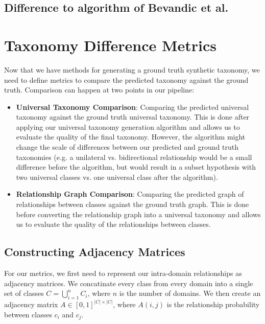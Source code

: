 \subsection{Difference to algorithm of Bevandic et al.}


\section{Taxonomy Difference Metrics}

Now that we have methods for generating a ground truth synthetic taxonomy,
we need to define metrics to compare the predicted taxonomy against the ground truth.
Comparison can happen at two points in our pipeline:
\begin{itemize}
    \item \textbf{Universal Taxonomy Comparison}: Comparing the predicted universal taxonomy against the ground truth universal taxonomy.
          This is done after applying our universal taxonomy generation algorithm
          and allows us to evaluate the quality of the final taxonomy.
          However, the algorithm might change the scale of differences between our predicted and ground truth taxonomies
          (e.g. a unilateral vs. bidirectional relationship would be a small difference before the algorithm,
          but would result in a subset hypothesis with two universal classes vs. one universal class after the algorithm).
    \item \textbf{Relationship Graph Comparison}: Comparing the predicted graph of relationships between classes against the ground truth graph.
          This is done before converting the relationship graph into a universal taxonomy
          and allows us to evaluate the quality of the relationships between classes.
\end{itemize}

\subsection{Constructing Adjacency Matrices}

For our metrics, we first need to represent our intra-domain relationships as adjacency matrices.
We concatinate every class from every domain into a single set of classes $C = \bigcup_{i=1}^n C_i$,
where $n$ is the number of domains.
We then create an adjacency matrix $A\in [0, 1]^{|C|\times|C|}$,
where $A(i,j)$ is the relationship probability between classes $c_i$ and $c_j$.


